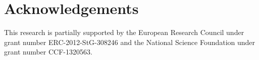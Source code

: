 \section*{Acknowledgements}
This research is partially supported by the European Research Council
under grant number ERC-2012-StG-308246 and the National Science
Foundation under grant number CCF-1320563.
